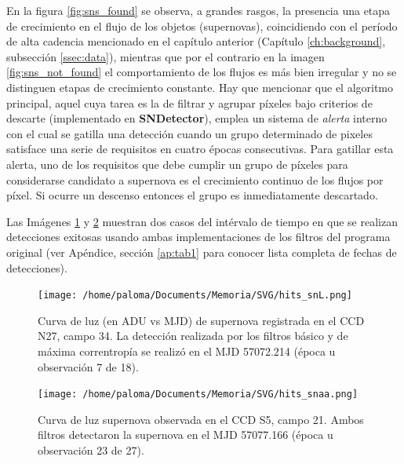 En la figura \ref{fig:sns_found} se observa, a grandes rasgos, la presencia una etapa de crecimiento en el flujo de los objetos (supernovas), coincidiendo con el per\'iodo de alta cadencia mencionado en el cap\'itulo anterior (Cap\'itulo \ref{ch:background}, subsecci\'on \ref{ssec:data}), mientras que por el contrario en la imagen \ref{fig:sns_not_found} el comportamiento de los flujos es m\'as bien irregular y no se distinguen etapas de crecimiento constante. Hay que mencionar que el algoritmo principal, aquel cuya tarea es la de filtrar y agrupar p\'ixeles bajo criterios de descarte (implementado en \textbf{SNDetector}), emplea un sistema de \textit{alerta} interno con el cual se gatilla una detecci\'on cuando un grupo determinado de pixeles satisface una serie de requisitos en cuatro \'epocas consecutivas. Para gatillar esta alerta, uno de los requisitos que debe cumplir un grupo de p\'ixeles para considerarse candidato a supernova es el crecimiento continuo de los flujos por p\'ixel. Si ocurre un descenso entonces el grupo es inmediatamente descartado.  
\bigskip

Las Im\'agenes \ref{fig:orig_det_snL} y \ref{fig:orig_det_snaa} muestran dos casos del int\'ervalo de tiempo en que se realizan detecciones exitosas usando ambas implementaciones de los filtros del programa original (ver Ap\'endice, secci\'on \ref{ap:tab1} para conocer lista completa de fechas de detecciones).
\bigskip

\begin{figure}[h!]
\centering
\texttt{[image: /home/paloma/Documents/Memoria/SVG/hits\_snL.png]}
\caption{Curva de luz (en ADU vs MJD) de supernova registrada en el CCD N27, campo 34. La detecci\'on realizada por los filtros b\'asico y de m\'axima correntrop\'ia se realiz\'o en el MJD 57072.214 (\'epoca u observaci\'on 7 de 18). }
\label{fig:orig_det_snL}
\end{figure}


\begin{figure}[h!]
\centering
\texttt{[image: /home/paloma/Documents/Memoria/SVG/hits\_snaa.png]}
\caption{Curva de luz supernova observada en el CCD S5, campo 21. Ambos filtros detectaron la supernova en el MJD 57077.166 (\'epoca u observaci\'on 23 de 27).}
\label{fig:orig_det_snaa}
\end{figure}
\bigskip

